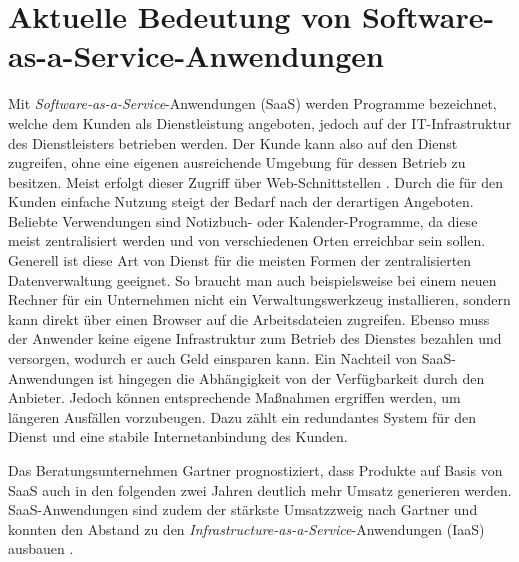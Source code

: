 
\chapter{Aktuelle Bedeutung von Software-as-a-Service-Anwendungen}

Mit \textit{Software-as-a-Service}-Anwendungen (SaaS) werden Programme bezeichnet, welche dem Kunden als Dienstleistung angeboten, jedoch auf der IT-Infrastruktur des Dienstleisters betrieben werden. Der Kunde kann also auf den Dienst zugreifen, ohne eine eigenen ausreichende Umgebung für dessen Betrieb zu besitzen. Meist erfolgt dieser Zugriff über Web-Schnittstellen \cite{McNee2007}. Durch die für den Kunden einfache Nutzung steigt der Bedarf nach der derartigen Angeboten. Beliebte Verwendungen sind Notizbuch- oder Kalender-Programme, da diese meist zentralisiert werden und von verschiedenen Orten erreichbar sein sollen. Generell ist diese Art von Dienst für die meisten Formen der zentralisierten Datenverwaltung geeignet. So braucht man auch beispielsweise bei einem neuen Rechner für ein Unternehmen nicht ein Verwaltungswerkzeug installieren, sondern kann direkt über einen Browser auf die Arbeitsdateien zugreifen. Ebenso muss der Anwender keine eigene Infrastruktur zum Betrieb des Dienstes bezahlen und versorgen, wodurch er auch Geld einsparen kann. Ein Nachteil von SaaS-Anwendungen ist hingegen die Abhängigkeit von der Verfügbarkeit durch den Anbieter. Jedoch können entsprechende Maßnahmen ergriffen werden, um längeren Ausfällen vorzubeugen. Dazu zählt ein redundantes System für den Dienst und eine stabile Internetanbindung des Kunden.

Das Beratungsunternehmen Gartner prognostiziert, dass Produkte auf Basis von SaaS auch in den folgenden zwei Jahren deutlich mehr Umsatz generieren werden. SaaS-Anwendungen sind zudem der stärkste Umsatzzweig nach Gartner und konnten den Abstand zu den \textit{Infrastructure-as-a-Service}-Anwendungen (IaaS) ausbauen \cite{Gartner2019}.


